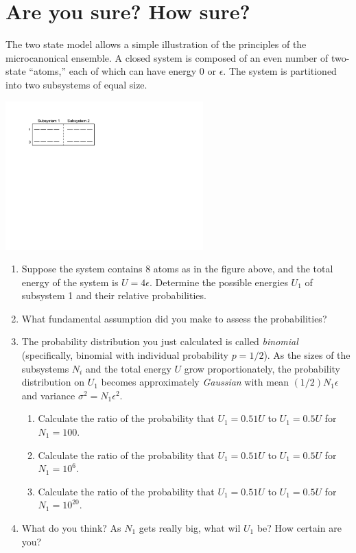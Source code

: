 \documentclass[11pt]{article}
\begin{document}
\section{Are you sure? How sure?}
\label{sec:org029a860}
The two state model allows a simple illustration
  of the principles of the microcanonical ensemble. A closed system is composed of an even
  number of two-state ``atoms,'' each of which can have energy 0 or \(\epsilon\).  The
  system is partitioned into two subsystems of equal size.

\begin{center}
\includegraphics[width=3in]{./figs/Two-state.pdf}
\end{center}


\begin{enumerate}
\item Suppose the system contains 8 atoms as in the figure above, and the total energy of
the system is \(U = 4\epsilon\).  Determine the possible energies \(U_1\) of subsystem 1 and
their relative probabilities.
\item What fundamental assumption did you make to assess the probabilities?

\item The probability distribution you just calculated is called \emph{binomial}
(specifically, binomial with individual probability \(p=1/2\)).  As the sizes of
the subsystems \(N_i\) and the total energy \(U\) grow proportionately, the
probability distribution on \(U_1\) becomes approximately \emph{Gaussian} with mean
\((1/2) N_1\epsilon\) and variance \(\sigma^2 = N_1\epsilon^2\).

\begin{enumerate}
\item Calculate the ratio of the probability that \(U_1=0.51 U\) to \(U_1=0.5 U\) for \(N_1 = 100\).
\item Calculate the ratio of the probability that \(U_1=0.51 U\) to \(U_1=0.5 U\) for \(N_1 = 10^6\).
\item Calculate the ratio of the probability that \(U_1=0.51 U\) to \(U_1=0.5 U\) for \(N_1 = 10^{20}\).
\end{enumerate}

\item What do you think? As \(N_1\) gets really big, what wil \(U_1\) be?  How certain are you?
\end{enumerate}
\end{document}
